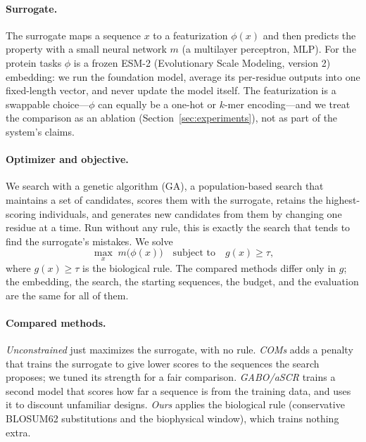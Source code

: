 \documentclass{article}
\begin{document}
\paragraph{Surrogate.}
The surrogate maps a sequence $x$ to a featurization $\phi(x)$ and then predicts the
property with a small neural network $m$ (a multilayer perceptron, MLP). For the protein
tasks $\phi$ is a frozen ESM-2 (Evolutionary Scale Modeling, version 2)
\citep{lin2023esm2} embedding: we run the foundation model,
average its per-residue outputs into one fixed-length vector, and never update the model
itself. The featurization is a swappable choice---$\phi$ can equally be a one-hot or
$k$-mer encoding---and we treat the comparison as an ablation
(Section~\ref{sec:experiments}), not as part of the system's claims.

\paragraph{Optimizer and objective.}
We search with a genetic algorithm (GA), a population-based search that maintains a set of
candidates, scores them with the surrogate, retains the highest-scoring individuals, and
generates new candidates from them by changing one residue at a time. Run without any rule,
this is exactly the search that tends to find the surrogate's mistakes. We solve
\[
\max_{x}\; m\big(\phi(x)\big) \quad \text{subject to}\quad g(x) \ge \tau,
\]
where $g(x)\ge\tau$ is the biological rule. The compared methods differ only in $g$; the
embedding, the search, the starting sequences, the budget, and the evaluation are the same
for all of them.

\paragraph{Compared methods.}
\emph{Unconstrained} just maximizes the surrogate, with no rule. \emph{COMs}
\citep{trabucco2021coms} adds a penalty that trains the surrogate to give lower scores to
the sequences the search proposes; we tuned its strength for a fair comparison.
\emph{GABO/aSCR} \citep{yao2024gabo} trains a second model that scores how far a sequence is
from the training data, and uses it to discount unfamiliar designs. \emph{Ours} applies the
biological rule (conservative BLOSUM62 substitutions and the biophysical window), which
trains nothing extra.
\end{document}
